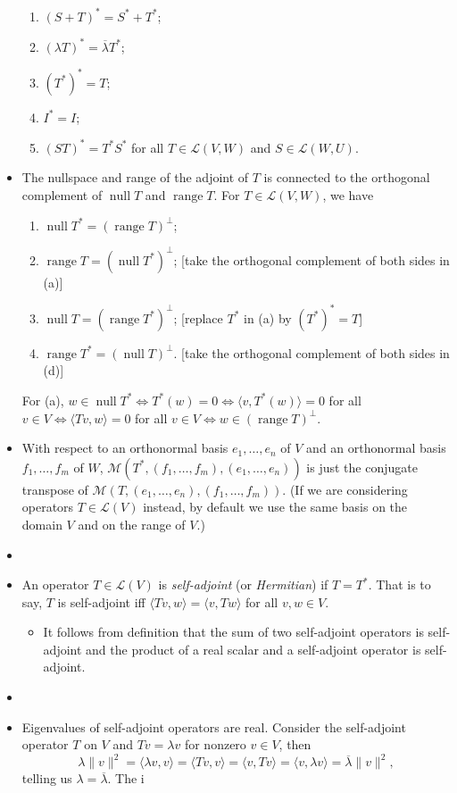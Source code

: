 \documentclass{article}
\newcommand{\n}{\operatorname{null}}
\renewcommand{\r}{\operatorname{range}}
\newcommand{\conj}[1]{\overline{#1}}
\newcommand{\inp}[2]{\langle #1, #2 \rangle}
\newcommand{\nm}[1]{\| #1 \|}
\newcommand{\LV}{\mathcal{L}(V)}
\newcommand{\LVW}{\mathcal{L}(V,W)}
\newcommand{\M}{\mathcal{M}}
\begin{document}
\begin{itemize}
    \begin{enumerate}[label=(\alph*)]
        \item $(S+T)^* = S^* + T^*$;
        \item $(\lambda T)^* = \conj{\lambda}T^*$;
        \item $(T^*)^* = T$;
        \item $I^* = I$;
        \item $(ST)^* = T^*S^*$ for all $T \in \LVW$ and $S \in \mathcal{L}(W,U)$.
    \end{enumerate}
    \item The nullspace and range of the adjoint of $T$ is connected to the orthogonal complement of $\n T$ and $\r T$. For $T \in \LVW$, we have
    \begin{enumerate}[label=(\alph*)]
        \item $\n T^* = (\r T)^\perp$;
        \item $\r T = (\n T^*)^\perp$; [take the orthogonal complement of both sides in (a)]
        \item $\n T = (\r T^*)^\perp$; [replace $T^*$ in (a) by $(T^*)^* = T$]
        \item $\r T^* = (\n T)^\perp$. [take the orthogonal complement of both sides in (d)]
    \end{enumerate}
    For (a), $w \in \n T^* \iff T^*(w) = 0 \iff \inp{v}{T^*(w)} = 0$ for all $v \in V \iff \inp{Tv}{w} = 0$ for all $v \in V \iff w \in (\r T)^\perp$.
    \item With respect to an orthonormal basis $e_1,\dots,e_n$ of $V$ and an orthonormal basis $f_1,\dots,f_m$ of $W$, $\M(T^*,(f_1,\dots,f_m),(e_1,\dots,e_n))$ is just the conjugate transpose of $\M(T,(e_1,\dots,e_n),(f_1,\dots,f_m))$. (If we are considering operators $T \in \LV$ instead, by default we use the same basis on the domain $V$ and on the range of $V$.)
    \item 
    \item An operator $T \in \LV$ is \textit{self-adjoint} (or \textit{Hermitian}) if $T=T^*$. That is to say, $T$ is self-adjoint iff $\inp{Tv}{w}=\inp{v}{Tw}$ for all $v,w \in V$.
    \begin{itemize}
        \item It follows from definition that the sum of two self-adjoint operators is self-adjoint and the product of a real scalar and a self-adjoint operator is self-adjoint.
    \end{itemize}
    \item 
    \item Eigenvalues of self-adjoint operators are real. Consider the self-adjoint operator $T$ on $V$ and $Tv = \lambda v$ for nonzero $v \in V$, then $$\lambda \nm{v}^2 = \inp{\lambda v}{v} = \inp{Tv}{v} = \inp{v}{Tv} = \inp{v}{\lambda v} = \conj{\lambda}\nm{v}^2,$$ telling us $\lambda = \conj{\lambda}$. The i

\end{itemize}
\end{document}
